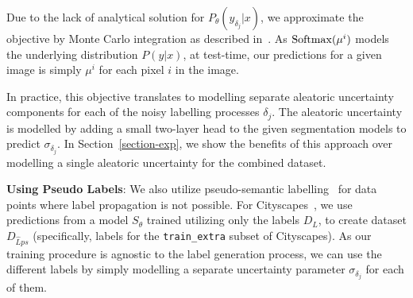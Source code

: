 \let\clearpage\relax

Due to the lack of analytical solution for $ P_\theta(y_{\delta_j} | x)$, %
we approximate the objective by Monte Carlo integration as described in~\cite{gal_main}. %
As $\operatorname{Softmax}(\mu^i)$ models the underlying distribution $P(y|x)$, at test-time, our predictions for a given image is simply $\mu^i$ for each pixel $i$ in the image.

In practice, this objective translates to modelling separate aleatoric uncertainty components for each of the noisy labelling processes $\delta_j$. The aleatoric uncertainty is modelled by adding a small two-layer head to the given segmentation models to predict $\sigma_{\delta_j}$. In Section~\ref{section-exp}, we show the benefits of this approach over modelling a single aleatoric uncertainty for the combined dataset.

\textbf{Using Pseudo Labels}: We also utilize pseudo-semantic labelling~\cite{taskonomy2018, pseudo_nips_1} for data points where label propagation is not possible. For Cityscapes~\cite{cs_dataset}, we use predictions from a model $S_\theta$ trained utilizing only the labels $D_L$, to create dataset $D_{\hat{L}ps}$ (specifically, labels for the \texttt{train\_extra} subset of Cityscapes). As our training procedure is agnostic to the label generation process, we can use the different labels by simply modelling a separate uncertainty parameter $\sigma_{\delta_j}$ for each of them. 




